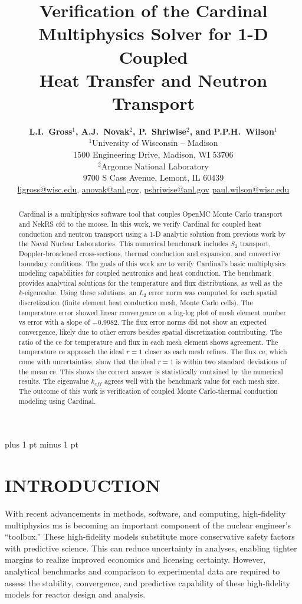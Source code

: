 \documentclass[letterpaper]{mc2023}
\title{Verification of the Cardinal Multiphysics Solver for 1-D Coupled\\
Heat Transfer and Neutron Transport}
\author{%
  \textbf{L.I.~Gross$^1$, A.J.~Novak$^2$, P.~Shriwise$^2$, and P.P.H.~Wilson$^1$}\\
  $^1$University of Wisconsin -- Madison  \\
  1500 Engineering Drive, Madison, WI 53706 \vspace{6pt}\\
  $^2$Argonne National Laboratory \\
  9700 S Cass Avenue, Lemont, IL 60439\vspace{6pt} \\
  \url{ligross@wisc.edu}, \url{anovak@anl.gov}, \url{pshriwise@anl.gov} \url{paul.wilson@wisc.edu}
}
\begin{document}
\maketitle
\justify
\parskip 6pt plus 1 pt minus 1 pt

\begin{abstract}
  Cardinal is a multiphysics software tool that couples OpenMC Monte Carlo transport and NekRS \gls{cfd} to the \gls{moose}.
  In this work, we verify Cardinal for coupled heat conduction and neutron transport using a 1-D analytic solution from previous
  work by the Naval Nuclear Laboratories. This numerical benchmark includes $S_2$ transport, Doppler-broadened cross-sections,
  thermal conduction and expansion, and convective boundary conditions. The goals of this work are to verify Cardinal's basic
  multiphysics modeling capabilities for coupled neutronics and heat conduction. The benchmark provides analytical solutions for
  the temperature and flux distributions, as well as the $k$-eigenvalue. Using these solutions, an $L_{2}$ error norm was computed
  for each spatial discretization (finite element heat conduction mesh, Monte Carlo cells). The temperature error showed linear
  convergence on a log-log plot of mesh element number vs error with a slope of $-0.9982$. The flux error norms did not show an
  expected convergence, likely due to other errors besides spatial discretization contributing. The ratio of the \gls{ce} for
  temperature and flux in each mesh element shows agreement. The temperature \gls{ce} approach the ideal $r=1$ closer as each mesh
  refines. The flux \gls{ce}, which come with uncertainties, show that the ideal $r=1$ is within two standard deviations of the
  mean \gls{ce}. This shows the correct answer is statistically contained by the numerical results. The eigenvalue $k_{eff}$ agrees
  well with the benchmark value for each mesh size. The outcome of this work is verification of coupled Monte Carlo-thermal conduction
  modeling using Cardinal.
\end{abstract}
\vspace{6pt}

\section{INTRODUCTION}
\label{sec:intro}
With recent advancements in methods, software, and computing, high-fidelity multiphysics \gls{ms} is becoming an important
component of the nuclear engineer's ``toolbox.'' These high-fidelity models substitute more conservative safety factors
with predictive science. This can reduce uncertainty in analyses, enabling tighter margins to realize improved economics
and licensing certainty. However, analytical benchmarks and comparison to experimental data are required to assess the stability,
convergence, and predictive capability of these high-fidelity models for reactor design and analysis.
\end{document}
